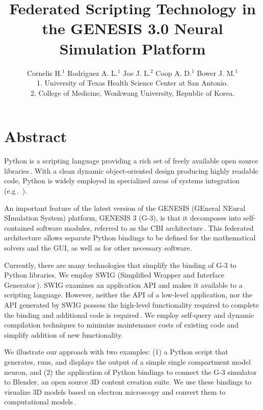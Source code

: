 \documentclass[12pt]{article}
\begin{document}
\title{Federated Scripting Technology in the GENESIS 3.0 Neural
  Simulation Platform}

\author{Cornelis H.$^1$ Rodriguez A. L.$^1$ Joe J. L.$^2$ Coop A. D.$^1$ Bower J. M.$^1$\\
  {\small 1. University of Texas Health Science Center at San Antonio.} \\
  {\small 2. College of Medicine, Wonkwang University, Republic of Korea.}
}

\maketitle
{}
\section*{Abstract}
Python is a scripting language providing a rich set of freely
available open source
libraries\,\cite{langtangen04:_python_scrip_comput_scien}. With a
clean dynamic object-oriented design producing highly readable code,
Python is widely employed in specialized areas of systems integration
(e.g\,.~\cite{thiruvathukal01:_web_progr_python}).

An important feature of the latest version of the GENESIS (GEneral
NEural SImulation System) platform, GENESIS 3 (G-3), is that it
decomposes into self-contained software modules, referred to as the
CBI architecture\,\cite{cornelis08:_cbi_archit_comput_simul_realis}.
This federated architecture allows separate Python bindings to be
defined for the mathematical solvers and the GUI, as well as for other
necessary software.

Currently, there are many technologies that simplify the binding of G-3
to Python libraries.  We employ SWIG (Simplified Wrapper and Interface
Generator\,\cite{08:_simpl_wrapp_inter_gener}).  SWIG examines an
application API and makes it available to a scripting language.
However, neither the API of a low-level application, nor the API
generated by SWIG possess the high-level functionality required to
complete the binding and additional code is
required\,\cite{08:_swig_python}. We employ self-query and dynamic
compilation techniques to minimize maintenance costs of existing code
and simplify addition of new functionality.

We illustrate our approach with two examples: (1) a Python script that
generates, runs, and displays the output of a simple single
compartment model neuron, and (2) the application of Python bindings
to connect the G-3 simulator to Blender, an open source 3D content
creation suite.  We use these bindings to visualize 3D models based on
electron microscopy and convert them to computational
models\,\cite{cornelis08:_model_neuros_genes}.
\end{document}
